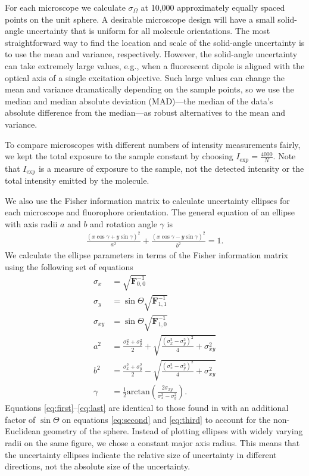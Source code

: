 \documentclass[10pt]{article}
\providecommand{\mb}[1]{\mathbf{#1}}
\begin{document}
For each microscope we calculate $\sigma_{\Omega}$ at 10,000 approximately
equally spaced points on the unit sphere. A desirable microscope design will
have a small solid-angle uncertainty that is uniform for all molecule
orientations. The most straightforward way to find the location and scale of the
solid-angle uncertainty is to use the mean and variance, respectively. However,
the solid-angle uncertainty can take extremely large values, e.g., when a
fluorescent dipole is aligned with the optical axis of a single excitation
objective. Such large values can change the mean and variance dramatically
depending on the sample points, so we use the median and median absolute
deviation (MAD)---the median of the data's absolute difference from the
median---as robust alternatives to the mean and variance.

To compare microscopes with different numbers of intensity measurements fairly,
we kept the total exposure to the sample constant by choosing
$I_{\text{exp}} = \frac{4000}{N}$. Note that $I_{\text{exp}}$ is a measure of
exposure to the sample, not the detected intensity or the total intensity
emitted by the molecule.

We also use the Fisher information matrix to calculate uncertainty ellipses for
each microscope and fluorophore orientation. The general equation of an ellipse
with axis radii $a$ and $b$ and rotation angle $\gamma$ is
\begin{align}
  \frac{(x\cos\gamma + y\sin\gamma)^2}{a^2} + \frac{(x\cos\gamma - y\sin\gamma)^2}{b^2} =1. 
\end{align}
We calculate the ellipse parameters in terms of the Fisher information matrix
using the following set of equations
\begin{align}
  \sigma_x &= \sqrt{\mb{F}^{-1}_{0,0}} \label{eq:first}\\
  \sigma_y &= \sin\Theta\sqrt{\mb{F}^{-1}_{1,1}} \label{eq:second}\\ 
  \sigma_{xy} &= \sin\Theta\sqrt{\mb{F}^{-1}_{1,0}} \label{eq:third}\\  
  a^2 &= \frac{\sigma_x^2 + \sigma_y^2}{2} + \sqrt{\frac{(\sigma_x^2 - \sigma_y^2)^2}{4} + \sigma_{xy}^2}\\
  b^2 &= \frac{\sigma_x^2 + \sigma_y^2}{2} - \sqrt{\frac{(\sigma_x^2 - \sigma_y^2)^2}{4} + \sigma_{xy}^2}\\
  \gamma &= \frac{1}{2}\text{arctan}\left(\frac{2\sigma_{xy}}{\sigma_x^2 - \sigma_y^2}\right). \label{eq:last}
\end{align}
Equations \ref{eq:first}--\ref{eq:last} are identical to those found in
\cite{coe2009} with an additional factor of $\sin\Theta$ on equations
\ref{eq:second} and \ref{eq:third} to account for the non-Euclidean geometry of
the sphere. Instead of plotting ellipses with widely varying radii on the same
figure, we chose a constant major axis radius. This means that the uncertainty
ellipses indicate the relative size of uncertainty in different directions, not
the absolute size of the uncertainty.
\end{document}
